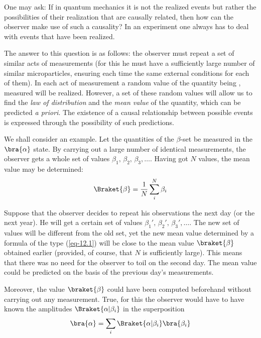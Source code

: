 \documentclass[a4paper,sfsidenotes,colorlinks=true]{tufte-book}
\numberwithin{equation}{section}
\numberwithin{figure}{section}
\begin{document}
One  may
ask: If in quantum mechanics it is not the realized events but rather
the possibilities of their realization that are causally related,
then how can the observer make use of such a causality? In an
experiment one always has to deal with events that have been
realized. 

The answer to this question is as follows: the observer must repeat a
set of similar acts of measurements (for this he must have a
sufficiently large number of similar microparticles, ensuring each
time the same external conditions for each of them). In each act of
measurement a random value of the quantity being , measured will be
realized. However, a set of these random values will allow us to find
the \emph{law of distribution} and the \emph{mean value} of the
quantity, which can be predicted \emph{a priori}. The existence of a
causal relationship between possible events is expressed through the
possibility of such predictions.


We shall consider an example. Let the quantities of the $\beta$-set be
measured in the  $\bra{\alpha}$ state. By carrying out a large number of
identical measurements, the observer gets a whole set of values
$\beta_{1}, \, \beta_{2}, \, \beta_{3}, \ldots$.  Having got $N$ values, the
mean value may be determined:
\begin{equation}%
\Braket{\beta} = \frac{1}{N} \sum_{i}^{N} \beta_{i}
\label{eq-12.1}
\end{equation}

Suppose that the observer decides to repeat his observations the next
day (or the next year). He will get a certain set of values
$\beta_{1}', \, \beta_{2}', \, \beta_{3}', \ldots$. The new set of values
will be different from the old set, yet the new mean value determined
by a formula of the type (\ref{eq-12.1}) will be close to the mean
value $\braket{\beta}$ obtained earlier (provided, of course, that $N$
is sufficiently large). This means that there was no need for the
observer to toil on the second day. The mean value could be predicted
on the basis of the previous day's measurements.


Moreover, the value $\braket{\beta}$ could have been computed
beforehand without carrying out any measurement. True, for this the
observer would have to have known the amplitudes $\Braket{\alpha |
  \beta_{i}}$ in the superposition
\begin{equation}%
\bra{\alpha} = \sum_{i} \Braket{\alpha|\beta_{i}} \bra{\beta_{i}}
\label{eq-12.2}
\end{equation}
\end{document}
